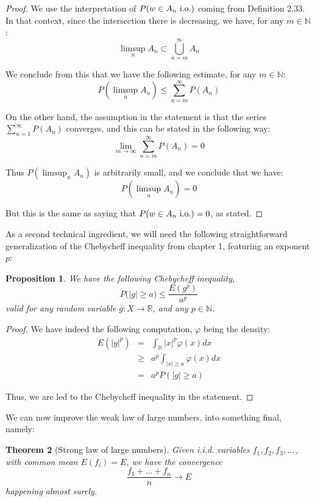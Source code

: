 \documentclass[12pt]{amsbook}
\newtheorem{theorem}{Theorem}[chapter]
\newtheorem{proposition}[theorem]{Proposition}
\begin{document}
\begin{proof}
We use the interpretation of $P(w\in A_n\ {\rm i.o.})$ coming from Definition 2.33. In that context, since the intersection there is decreasing, we have, for any $m\in\mathbb N$:
$$\limsup_nA_n\subset\bigcup_{n=m}^\infty A_n$$

We conclude from this that we have the following estimate, for any $m\in\mathbb N$:
$$P(\limsup_nA_n)\leq\sum_{n=m}^\infty P(A_n)$$

On the other hand, the assumption in the statement is that the series $\sum_{n=1}^\infty P(A_n)$ converges, and this can be stated in the following way:
$$\lim_{m\to\infty}\sum_{n=m}^\infty P(A_n)=0$$

Thus $P(\limsup_nA_n)$ is arbitrarily small, and we conclude that we have:
$$P(\limsup_nA_n)=0$$

But this is the same as saying that $P(w\in A_n\ {\rm i.o.})=0$, as stated.
\end{proof}

As a second technical ingredient, we will need the following straightforward generalization of the Chebycheff inequality from chapter 1, featuring an exponent $p$:


\begin{proposition}
We have the following Chebycheff inequality,
$$P\big(|g|\geq a\big)\leq\frac{E(g^p)}{a^p}$$
valid for any random variable $g:X\to\mathbb R$, and any $p\in\mathbb N$.
\end{proposition}

\begin{proof}
We have indeed the following computation, $\varphi$ being the density:
\begin{eqnarray*}
E(|g|^p)
&=&\int_\mathbb R|x|^p\varphi(x)dx\\
&\geq&a^p\int_{|x|\geq a}\varphi(x)dx\\
&=&a^pP(|g|\geq a)
\end{eqnarray*}

Thus, we are led to the Chebycheff inequality in the statement.
\end{proof}

We can now improve the weak law of large numbers, into something final, namely:


\begin{theorem}[Strong law of large numbers]
Given i.i.d. variables $f_1,f_2,f_3,\ldots\,$, with common mean $E(f_i)=E$, we have the convergence
$$\frac{f_1+\ldots+f_n}{n}\to E$$
happening almost surely.
\end{theorem}
\end{document}
